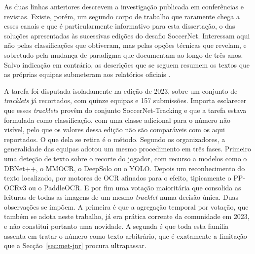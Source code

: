 As duas linhas anteriores descrevem a investigação publicada em conferências e revistas.
Existe, porém, um segundo corpo de trabalho que raramente chega a esses canais e que é
particularmente informativo para esta dissertação, o das soluções apresentadas às
sucessivas edições do desafio SoccerNet. Interessam aqui não pelas classificações que
obtiveram, mas pelas opções técnicas que revelam, e sobretudo pela mudança de paradigma
que documentam ao longo de três anos. Salvo indicação em contrário, as descrições que se
seguem resumem os textos que as próprias equipas submeteram aos relatórios oficiais
\citep{cioppa2023soccernet, cioppa2024soccernet, giancola2025soccernet}.

A tarefa foi disputada isoladamente na edição de 2023, sobre um conjunto de
\emph{tracklets} já recortados, com quinze equipas e 157 submissões. Importa esclarecer
que esses \emph{tracklets} provêm do conjunto SoccerNet-Tracking e que a tarefa estava
formulada como classificação, com uma classe adicional para o número não visível, pelo que
os valores dessa edição não são comparáveis com os aqui reportados. O que dela se retira é
o método. Segundo os organizadores, a generalidade das equipas adotou um mesmo
procedimento em três fases. Primeiro uma deteção de texto sobre o recorte do jogador, com
recurso a modelos como o DBNet++, o MMOCR, o DeepSolo ou o YOLO. Depois um reconhecimento
do texto localizado, por motores de OCR afinados para o efeito, tipicamente o PP-OCRv3 ou
o PaddleOCR. E por fim uma votação maioritária que consolida as leituras de todas as
imagens de um mesmo \emph{tracklet} numa decisão única. Duas observações se impõem. A
primeira é que a agregação temporal por votação, que também se adota neste trabalho, já
era prática corrente da comunidade em 2023, e não constitui portanto uma novidade. A
segunda é que toda esta família assenta em tratar o número como texto arbitrário, que é
exatamente a limitação que a Secção~\ref{sec:met-jnr} procura ultrapassar.

